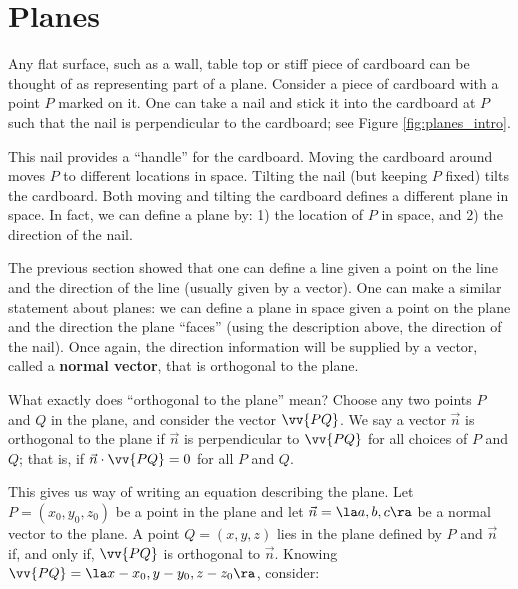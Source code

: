 \section{Planes}\label{sec:planes}

Any flat surface, such as a wall, table top or stiff piece of cardboard can be thought of as representing part of a plane. Consider a piece of cardboard with a point $P$ marked on it. One can take a nail and stick it into the cardboard at $P$ such that the nail is perpendicular to the cardboard; see Figure \ref{fig:planes_intro}.%

This nail provides a ``handle'' for the cardboard. Moving the cardboard around moves $P$ to different locations in space. Tilting the nail (but keeping $P$ fixed) tilts the cardboard. Both moving and tilting the cardboard defines a different plane in space. In fact, we can define a plane by: 1) the location of $P$ in space, and 2) the direction of the nail.

The previous section showed that one can define a line given a point on the line and the direction of the line (usually given by a vector). One can make a similar statement about planes: we can define a plane in space given a point on the plane and the direction the plane ``faces'' (using the description above, the direction of the nail). Once again, the direction information will be supplied by a vector, called a \textbf{normal vector}, that is orthogonal to the plane.

What exactly does ``orthogonal to the plane'' mean? Choose any two points $P$ and $Q$ in the plane, and consider the vector $\vv{PQ}$. We say a vector $\vec n$ is orthogonal to the plane if $\vec n$ is perpendicular to $\vv{PQ}$ for all choices of $P$ and $Q$; that is, if $\vec n\cdot \vv{PQ}=0$ for all $P$ and $Q$.

This gives us way of writing an equation describing the plane. Let $P=(x_0,y_0,z_0)$ be a point in the plane and let $\vec n = \la a,b,c\ra $ be a normal vector to the plane. A point $Q = (x,y,z)$ lies in the plane defined by $P$ and $\vec n$ if, and only if, $\vv{PQ}$ is orthogonal to $\vec n$. Knowing $\vv{PQ} = \la x-x_0,y-y_0,z-z_0\ra$, consider:

